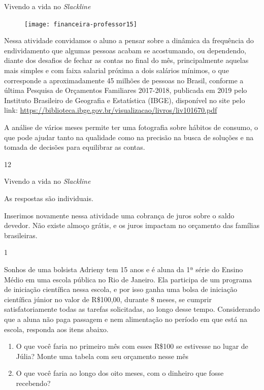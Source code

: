 \clearmargin
\begin{sugestions}{Vivendo a vida no \textit{Slackline}}
{
\begin{figure}
\vspace{-1em}
\texttt{[image: financeira-professor15]}
\end{figure}
Nessa atividade convidamos o aluno a pensar sobre a dinâmica da frequência do endividamento que algumas pessoas acabam se acostumando, ou dependendo, diante dos desafios de fechar as contas no final do mês, principalmente aquelas mais simples e com faixa salarial próxima a dois salários mínimos, o que corresponde a aproximadamente 45 milhões de pessoas no Brasil, conforme a última Pesquisa de Orçamentos Familiares 2017-2018, publicada em 2019 pelo Instituto Brasileiro de Geografia e Estatística (IBGE), disponível no site pelo link: \url{https://biblioteca.ibge.gov.br/visualizacao/livros/liv101670.pdf}

A análise de vários meses permite ter uma fotografia sobre hábitos de consumo, o que pode ajudar tanto na qualidade como na precisão na busca de soluções e na tomada de decisões para equilibrar as contas.
}{1}{2}
\end{sugestions}
\marginpar{\vspace{.5em}}


\begin{answer}{Vivendo a vida no \textit{Slackline}}
{
  As respostas são individuais. 

  Inserimos novamente nessa atividade uma cobrança de juros sobre o saldo devedor. Não existe almoço grátis, e os juros impactam no orçamento das famílias brasileiras.
}{1}
\end{answer}


\begin{task}{Sonhos de uma bolsista}
Adrieny tem 15 anos e é aluna da 1ª série do Ensino Médio em uma escola pública no Rio de Janeiro. Ela participa de um programa de iniciação científica nessa escola, e por isso ganha uma bolsa de iniciação científica júnior no valor de R\$100,00, durante 8 meses, se cumprir satisfatoriamente todas as tarefas solicitadas, ao longo desse tempo. Considerando que a aluna não paga passagem e nem alimentação no período em que está na escola, responda aos itens abaixo.

\begin{enumerate}
\item O que você faria no primeiro mês com esses R\$100 se estivesse no lugar de Júlia? Monte uma tabela com seu orçamento nesse mês
\item O que você faria ao longo dos oito meses, com o dinheiro que fosse recebendo?
\end{enumerate}
\end{task}

